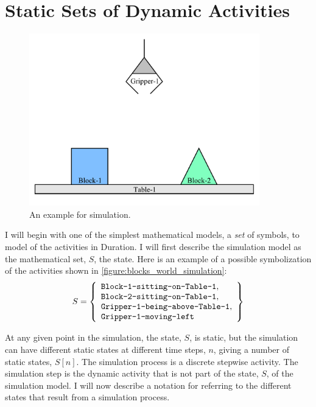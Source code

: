 \section{Static Sets of Dynamic Activities}

\begin{figure}[bth]
\includegraphics[width=10cm]{gfx/blocks_world_simulation}
\caption{An example for simulation.}
\label{figure:blocks_world_simulation}
\end{figure}

I will begin with one of the simplest mathematical models, a
\emph{set} of symbols, to model of the activities in Duration.  I will
first describe the simulation model as the mathematical set, $S$, the
state.  Here is an example of a possible symbolization of the
activities shown in \autoref{figure:blocks_world_simulation}:
\begin{equation}
\label{equation:example_initial_state}
S =
  \left\{
    \begin{array}{l}
      \text{{\tt Block-1-sitting-on-Table-1}}, \\
      \text{{\tt Block-2-sitting-on-Table-1}}, \\
      \text{{\tt Gripper-1-being-above-Table-1}}, \\
      \text{{\tt Gripper-1-moving-left}}
    \end{array}
  \right\}
\end{equation}

At any given point in the simulation, the state, $S$, is static, but
the simulation can have different static states at different time
steps, $n$, giving a number of static states, $S[n]$.  The simulation
process is a discrete stepwise activity.  The simulation step is the
dynamic activity that is not part of the state, $S$, of the simulation
model.  I will now describe a notation for referring to the different
states that result from a simulation process.

